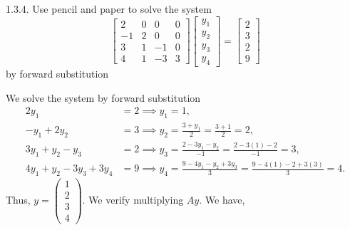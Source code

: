 \documentclass{report}
\begin{document}
    \pagebreak \bigbreak \noindent 
    \begin{mdframed}
        1.3.4. Use pencil and paper to solve the system
        \[
            \begin{bmatrix}
                2 & 0 & 0 & 0 \\
                -1 & 2 & 0 & 0 \\
                3 & 1 & -1 & 0 \\
                4 & 1 & -3 & 3
            \end{bmatrix}
            \begin{bmatrix}
                y_{1} \\
                y_{2} \\
                y_{3} \\
                y_{4}
            \end{bmatrix}
            =
            \begin{bmatrix}
                2 \\
                3 \\
                2 \\
                9
            \end{bmatrix}
        \]
        by forward substitution
    \end{mdframed}
    \bigbreak \noindent 
    We solve the system by forward substitution
    \begin{align*}
        2y_{1} &= 2 \implies y_{1} = 1, \\
        -y_{1} + 2y_{2} &= 3 \implies y_{2} = \frac{3+y_{1}}{2} = \frac{3+1}{2} = 2, \\
        3y_{1} + y_{2} - y_{3} &= 2 \implies y_{3} = \frac{2-3y_{1}-y_{2}}{-1} = \frac{2-3(1)-2}{-1} = 3, \\
        4y_{1} + y_{2} - 3y_{3} + 3y_{4} &= 9 \implies y_{4} = \frac{9-4y_{1}-y_{2}+3y_{3}}{3} = \frac{9-4(1)-2+3(3)}{3} = 4
    .\end{align*}
    Thus, $y = \begin{pmatrix} 1 \\ 2 \\ 3 \\ 4 \end{pmatrix} $. We verify multiplying $Ay$. We have,
\end{document}
